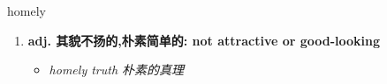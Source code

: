 
\begin{frame}
{\huge homely}
\begin{center}
\begin{enumerate}\Large
  \item \textbf{adj. 其貌不扬的,朴素简单的: not attractive or good-looking}
  \begin{itemize}
    \item \em{\Large{homely truth 朴素的真理}}
  \end{itemize}
\end{enumerate}
\end{center}
\end{frame}
